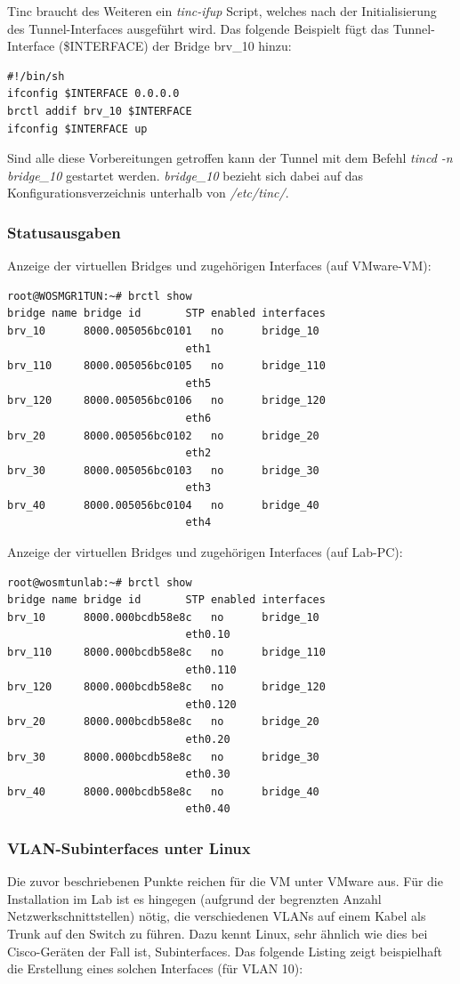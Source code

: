 Tinc braucht des Weiteren ein \emph{tinc-ifup} Script, welches nach der Initialisierung des Tunnel-Interfaces ausgeführt wird. Das folgende Beispielt fügt das Tunnel-Interface (\$INTERFACE) der Bridge brv\_10 hinzu:

\begin{lstlisting}
#!/bin/sh
ifconfig $INTERFACE 0.0.0.0
brctl addif brv_10 $INTERFACE
ifconfig $INTERFACE up
\end{lstlisting}

Sind alle diese Vorbereitungen getroffen kann der Tunnel mit dem Befehl \emph{tincd -n bridge\_10} gestartet werden. \emph{bridge\_10} bezieht sich dabei auf das Konfigurationsverzeichnis unterhalb von \emph{/etc/tinc/}.

\subsubsection{Statusausgaben}
Anzeige der virtuellen Bridges und zugehörigen Interfaces (auf VMware-VM):
\begin{lstlisting}
root@WOSMGR1TUN:~# brctl show
bridge name	bridge id		STP enabled	interfaces
brv_10		8000.005056bc0101	no		bridge_10
							eth1
brv_110		8000.005056bc0105	no		bridge_110
							eth5
brv_120		8000.005056bc0106	no		bridge_120
							eth6
brv_20		8000.005056bc0102	no		bridge_20
							eth2
brv_30		8000.005056bc0103	no		bridge_30
							eth3
brv_40		8000.005056bc0104	no		bridge_40
							eth4
\end{lstlisting}

Anzeige der virtuellen Bridges und zugehörigen Interfaces (auf Lab-PC):
\begin{lstlisting}
root@wosmtunlab:~# brctl show
bridge name	bridge id		STP enabled	interfaces
brv_10		8000.000bcdb58e8c	no		bridge_10
							eth0.10
brv_110		8000.000bcdb58e8c	no		bridge_110
							eth0.110
brv_120		8000.000bcdb58e8c	no		bridge_120
							eth0.120
brv_20		8000.000bcdb58e8c	no		bridge_20
							eth0.20
brv_30		8000.000bcdb58e8c	no		bridge_30
							eth0.30
brv_40		8000.000bcdb58e8c	no		bridge_40
							eth0.40
\end{lstlisting}

\subsubsection{VLAN-Subinterfaces unter Linux}
Die zuvor beschriebenen Punkte reichen für die VM unter VMware aus. Für die Installation im Lab ist es hingegen (aufgrund der begrenzten Anzahl Netzwerkschnittstellen) nötig, die verschiedenen VLANs auf einem Kabel als Trunk auf den Switch zu führen. Dazu kennt Linux, sehr ähnlich wie dies bei Cisco-Geräten der Fall ist, Subinterfaces. Das folgende Listing zeigt beispielhaft die Erstellung eines solchen Interfaces (für VLAN 10):

